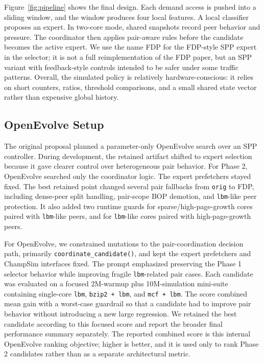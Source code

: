 \documentclass[10pt,letterpaper]{article}
\newcommand{\code}[1]{\texttt{#1}}
\begin{document}
Figure~\ref{fig:pipeline} shows the final design. Each demand access is pushed
into a sliding window, and the window produces four local features. A local
classifier proposes an expert. In two-core mode, shared snapshots record peer
behavior and pressure. The coordinator then applies pair-aware rules before the
candidate becomes the active expert. We use the name FDP for the FDP-style SPP
expert in the selector; it is not a full reimplementation of the FDP paper, but
an SPP variant with feedback-style controls intended to be safer under some
traffic patterns. Overall, the simulated policy is relatively
hardware-conscious: it relies on short counters, ratios, threshold comparisons,
and a small shared state vector rather than expensive global history.

\subsection*{OpenEvolve Setup}

The original proposal planned a parameter-only OpenEvolve search over an SPP
controller. During development, the retained artifact shifted to expert
selection because it gave clearer control over heterogeneous pair behavior.
For Phase 2, OpenEvolve searched only the coordinator logic. The expert
prefetchers stayed fixed. The best retained point changed several pair
fallbacks from \code{orig} to FDP, including dense-peer split handling,
pair-scope BOP demotion, and \code{lbm}-like peer protection. It also added two
runtime guards for sparse/high-page-growth cores paired with \code{lbm}-like
peers, and for \code{lbm}-like cores paired with high-page-growth peers.

For OpenEvolve, we constrained mutations to the pair-coordination decision path,
primarily \code{coordinate\_candidate()}, and kept the expert prefetchers and
ChampSim interfaces fixed. The prompt emphasized preserving the Phase 1
selector behavior while improving fragile \code{lbm}-related pair cases. Each
candidate was evaluated on a focused 2M-warmup plus 10M-simulation mini-suite
containing single-core \code{lbm}, \code{bzip2 + lbm}, and \code{mcf + lbm}. The
score combined mean gain with a worst-case guardrail so that a candidate had to
improve pair behavior without introducing a new large regression. We retained
the best candidate according to this focused score and report the broader final
performance summary separately. The reported combined score is this internal
OpenEvolve ranking objective; higher is better, and it is used only to rank
Phase 2 candidates rather than as a separate architectural metric.
\end{document}
